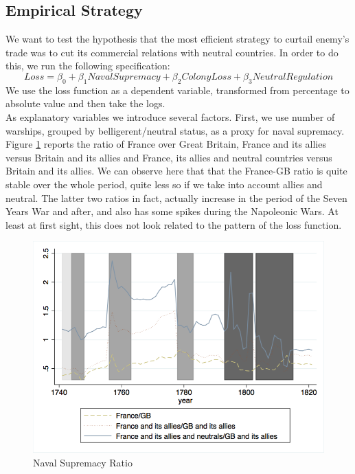 \documentclass[12pt,a4paper,notitlepage,english]{article}
\begin{document}
\subsection{Empirical Strategy}
We want to test the hypothesis that the most efficient strategy to curtail enemy's trade was to cut its commercial relations with neutral countries. In order to do this, we run the following specification: 
\begin{equation*}
Loss = \beta_0 + \beta_1NavalSupremacy+ \beta_2ColonyLoss+ \beta_3NeutralRegulation
\end{equation*}
We use the loss function as a dependent variable, transformed from percentage to absolute value and then take the logs. \\
As explanatory variables we introduce several factors. First, we use number of warships, grouped by belligerent/neutral status, as a proxy for naval supremacy. Figure \ref{naval_supremacy_ratios} reports the ratio of France over Great Britain, France and its allies versus Britain and its allies and France, its allies and neutral countries versus Britain and its allies. We can observe here that that the France-GB ratio is quite stable over the whole period, quite less so if we take into account allies and neutral. The latter two ratios in fact, actually increase in the period of the Seven Years War and after, and also has some spikes during the Napoleonic Wars. At least at first sight, this does not look related to the pattern of the loss function. 
\begin{center}
\begin{figure}[H]
\caption{Naval Supremacy Ratio}
\label{naval_supremacy_ratios}
\includegraphics[scale=.51]{naval_supremacy_ratios.png}
\end{figure}
\end{center}
\end{document}
